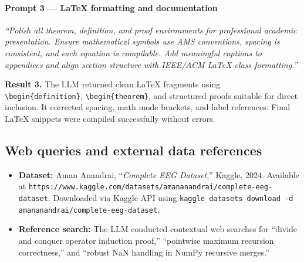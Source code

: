 \documentclass[11pt]{article}
\begin{document}
\paragraph{Prompt 3 — LaTeX formatting and documentation}
\textit{“Polish all theorem, definition, and proof environments for professional academic presentation.  
Ensure mathematical symbols use AMS conventions, spacing is consistent, and each equation is compilable.  
Add meaningful captions to appendices and align section structure with IEEE/ACM LaTeX class formatting.”}

\textbf{Result 3.}  
The LLM returned clean LaTeX fragments using \texttt{\textbackslash begin\{definition\}}, \texttt{\textbackslash begin\{theorem\}}, and structured proofs suitable for direct inclusion.  
It corrected spacing, math mode brackets, and label references.  
Final LaTeX snippets were compiled successfully without errors.


\subsection*{Web queries and external data references}

\begin{itemize}
  \item \textbf{Dataset:} Aman Anandrai, “\textit{Complete EEG Dataset},” Kaggle, 2024.  
    Available at \texttt{https://www.kaggle.com/datasets/amananandrai/complete-eeg-dataset}.  
    Downloaded via Kaggle API using \texttt{kaggle datasets download -d amananandrai/complete-eeg-dataset}.
  \item \textbf{Reference search:} The LLM conducted contextual web searches for  
    “divide and conquer operator induction proof,”  
    “pointwise maximum recursion correctness,” and  
    “robust NaN handling in NumPy recursive merges.”  
\end{itemize}
\end{document}
